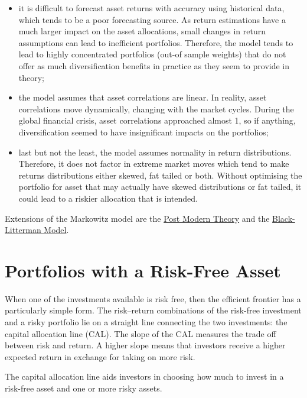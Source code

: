 \begin{itemize}
  	\tightlist
   	\item
   	it is difficult to forecast asset returns with accuracy using
   	historical data, which tends to be a poor forecasting source. As
   	return estimations have a much larger impact on the asset allocations,
   	small changes in return assumptions can lead to inefficient
   	portfolios. Therefore, the model tends to lead to highly concentrated
   	portfolios (out-of sample weights) that do not offer as much
   	diversification benefits in practice as they seem to provide in
   	theory;
    	\item
    	the model assumes that asset correlations are linear. In reality,
    	asset correlations move dynamically, changing with the market cycles.
    	During the global financial crisis, asset correlations approached
    	almost 1, so if anything, diversification seemed to have insignificant
    	impacts on the portfolios;
    	\item
    	last but not the least, the model assumes normality in return
    	distributions. Therefore, it does not factor in extreme market moves
    	which tend to make returns distributions either skewed, fat tailed or
    	both. Without optimising the portfolio for asset that may actually
    	have skewed distributions or fat tailed, it could lead to a riskier
    	allocation that is intended.
    \end{itemize}
    
Extensions of the Markowitz model are the  \href{https://en.wikipedia.org/wiki/Post-modern_portfolio_theory}{Post Modern Theory} and the \href{https://en.wikipedia.org/wiki/Black\%E2\%80\%93Litterman_model}{Black-Litterman Model}.
    
\section{Portfolios with a Risk-Free Asset}
\label{portfolios-with-a-risk-free-asset}

When one of the investments available is risk free, then the efficient
frontier has a particularly simple form. The risk–return combinations of the risk-free investment and a risky portfolio lie on a straight line connecting the two investments: the capital allocation line (CAL). The slope of the CAL measures the trade off
between risk and return. A higher slope means that investors receive a
higher expected return in exchange for taking on more risk.

The capital allocation line aids investors in choosing how much to
invest in a risk-free asset and one or more risky assets.

